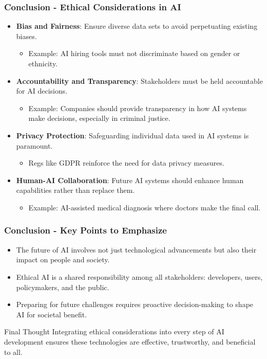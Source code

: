 \documentclass[aspectratio=169]{beamer}
\begin{document}
\begin{frame}[fragile]
    \frametitle{Conclusion - Ethical Considerations in AI}
    \begin{itemize}
        \item \textbf{Bias and Fairness}:
        Ensure diverse data sets to avoid perpetuating existing biases.
        \begin{itemize}
            \item Example: AI hiring tools must not discriminate based on gender or ethnicity.
        \end{itemize}

        \item \textbf{Accountability and Transparency}:
        Stakeholders must be held accountable for AI decisions.
        \begin{itemize}
            \item Example: Companies should provide transparency in how AI systems make decisions, especially in criminal justice.
        \end{itemize}

        \item \textbf{Privacy Protection}:
        Safeguarding individual data used in AI systems is paramount.
        \begin{itemize}
            \item Regs like GDPR reinforce the need for data privacy measures.
        \end{itemize}

        \item \textbf{Human-AI Collaboration}:
        Future AI systems should enhance human capabilities rather than replace them.
        \begin{itemize}
            \item Example: AI-assisted medical diagnosis where doctors make the final call.
        \end{itemize}
    \end{itemize}
\end{frame}

\begin{frame}[fragile]
    \frametitle{Conclusion - Key Points to Emphasize}
    \begin{itemize}
        \item The future of AI involves not just technological advancements but also their impact on people and society.
        \item Ethical AI is a shared responsibility among all stakeholders: developers, users, policymakers, and the public.
        \item Preparing for future challenges requires proactive decision-making to shape AI for societal benefit.
    \end{itemize}
    
    \begin{block}{Final Thought}
        Integrating ethical considerations into every step of AI development ensures these technologies are effective, trustworthy, and beneficial to all.
    \end{block}
\end{frame}
\end{document}
